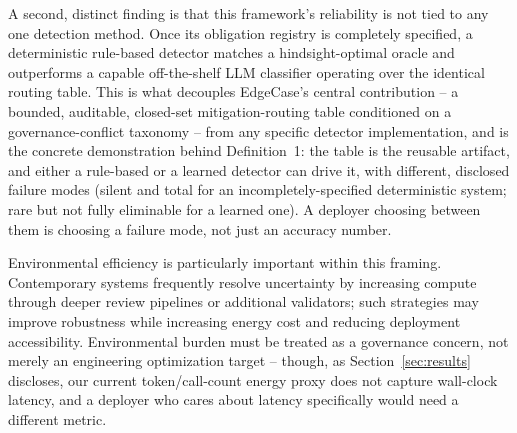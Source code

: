 \documentclass[letterpaper]{article} %
\begin{document}
A second, distinct finding is that this framework's reliability is not tied to any one detection method. Once its obligation registry is completely specified, a deterministic rule-based detector matches a hindsight-optimal oracle and outperforms a capable off-the-shelf LLM classifier operating over the identical routing table. This is what decouples EdgeCase's central contribution -- a bounded, auditable, closed-set mitigation-routing table conditioned on a governance-conflict taxonomy -- from any specific detector implementation, and is the concrete demonstration behind Definition~1: the table is the reusable artifact, and either a rule-based or a learned detector can drive it, with different, disclosed failure modes (silent and total for an incompletely-specified deterministic system; rare but not fully eliminable for a learned one). A deployer choosing between them is choosing a failure mode, not just an accuracy number.

Environmental efficiency is particularly important within this framing. Contemporary systems frequently resolve uncertainty by increasing compute through deeper review pipelines or additional validators; such strategies may improve robustness while increasing energy cost and reducing deployment accessibility. Environmental burden must be treated as a governance concern, not merely an engineering optimization target -- though, as Section~\ref{sec:results} discloses, our current token/call-count energy proxy does not capture wall-clock latency, and a deployer who cares about latency specifically would need a different metric.
\end{document}
